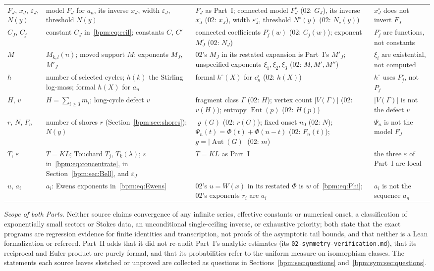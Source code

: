 \documentclass[11pt,a4paper]{article}
\theoremstyle{remark}\newtheorem{remark}[theorem]{Remark}%
\newcommand{\Aut}{\operatorname{Aut}}\newcommand{\ee}{\mathrm e}
\newcommand{\Ent}{\operatorname{Ent}}
\begin{document}
{\begin{longtable}{>{\raggedright}p{}>{\raggedright}p{}>{\raggedright}p{}>{\raggedright\arraybackslash}p{}}
$F_J$, $x_J$, $\varepsilon_J$, $N(y)$ & model $F_J$ for $a_n$, its inverse $x_J$, width $\varepsilon_J$, threshold $N(y)$ & $F_J$ as Part~I; connected model $F^\circ_J$ (02: $G_J$), its inverse $x^\circ_J$ (02: $x_J$), width $\varepsilon^\circ_J$, threshold $N^\circ(y)$ (02: $N_c(y)$) & $x^\circ_J$ does not invert $F_J$\\
$C_J$, $C_j$ & constant $C_J$ in~\eqref{bpm:eq:ceil}; constants $C$, $C'$ & connected coefficients $P^\circ_j(w)$ (02: $C_j(w)$); exponent $M^\circ_J$ (02: $N_J$) & $P^\circ_j$ are functions, not constants\\
$M$ & $M_{k,l}(n)$; moved support $M$; exponents $M_J$, $M'_J$ & 02's $M_J$ in its restated expansion is Part~I's $M'_J$; unspecified exponents $\xi_1,\xi_2,\xi_3$ (02: $M,M',M''$) & $\xi_i$ are existential, not computed\\
$h$ & number of selected cycles; $h(k)$ the Stirling log-mass; formal $h(X)$ for $a_n$ & formal $h^\circ(X)$ for $c^\circ_n$ (02: $h(X)$) & $h^\circ$ uses $P^\circ_j$, not $P_j$\\
$H$, $v$ & $H=\sum_{i\ge3}m_i$; long-cycle defect $v$ & fragment class $\Gamma$ (02: $H$); vertex count $|V(\Gamma)|$ (02: $v(H)$); entropy $\Ent(p)$ (02: $H(p)$) & $|V(\Gamma)|$ is not the defect $v$\\
$r$, $N$, $F_n$ & number of shores $r$ (Section~\ref{bpm:sec:shores}); $N(y)$ & $\varrho(G)$ (02: $r(G)$); fixed onset $n_0$ (02: $N$); $\Psi_n(t)=\Phi(t)+\Phi(n-t)$ (02: $F_n(t)$); $g=|\Aut(G)|$ (02: $m$) & $\Psi_n$ is not the model $F_J$\\
$T$, $\varepsilon$ & $T=KL$; Touchard $T_j$, $T_k(\lambda)$; $\varepsilon$ in~\eqref{bpm:eq:concentrate}, in Section~\ref{bpm:sec:Bell}, and $\varepsilon_J$ & $T=KL$ as Part~I & the three $\varepsilon$ of Part~I are local\\
$u$, $a_i$ & $a_i$: Ewens exponents in~\eqref{bpm:eq:Ewens} & 02's $u=W(x)$ in its restated $\Phi$ is $w$ of~\eqref{bpm:eq:Phi}; 02's exponents $r_i$ are $a_i$ & $a_i$ is not the sequence $a_n$\\
\end{longtable}
}

\emph{Scope of both Parts.} Neither source claims convergence of any
infinite series, effective constants or numerical onset, a classification
of exponentially small sectors or Stokes data, an unconditional
single-ceiling inverse, or exhaustive priority; both state that the exact
programs are regression evidence for finite identities and transcription,
not proofs of the asymptotic tail bounds, and that neither is a Lean
formalization or refereed. Part~II adds that it did not re-audit Part~I's
analytic estimates (its \nolinkurl{02-symmetry-verification.md}), that its
reciprocal and Euler product are purely formal, and that its probabilities
refer to the uniform measure on isomorphism classes. The statements each
source leaves sketched or unproved are collected as questions in
Sections~\ref{bpm:sec:questions} and~\ref{bpm:sym:sec:questions}.
\end{document}
